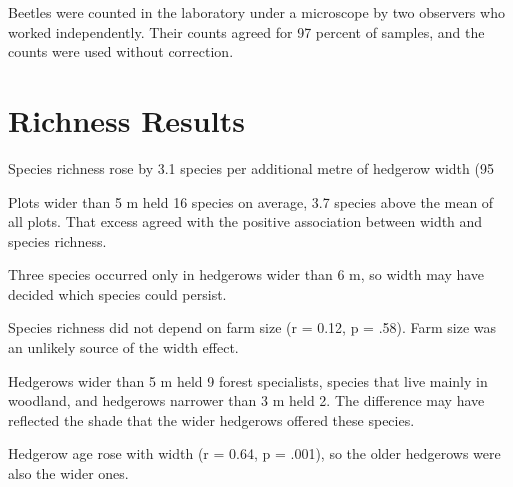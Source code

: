 \documentclass{article}
\begin{document}
Beetles were counted in the laboratory under a microscope by two observers who worked independently. Their counts agreed for 97 percent of samples, and the counts were used without correction.

\section{Richness Results}

Species richness rose by 3.1 species per additional metre of hedgerow width (95%

Plots wider than 5 m held 16 species on average, 3.7 species above the mean of all plots. That excess agreed with the positive association between width and species richness.

Three species occurred only in hedgerows wider than 6 m, so width may have decided which species could persist.

Species richness did not depend on farm size (r = 0.12, p = .58). Farm size was an unlikely source of the width effect.

Hedgerows wider than 5 m held 9 forest specialists, species that live mainly in woodland, and hedgerows narrower than 3 m held 2. The difference may have reflected the shade that the wider hedgerows offered these species.

Hedgerow age rose with width (r = 0.64, p = .001), so the older hedgerows were also the wider ones.


\end{document}
